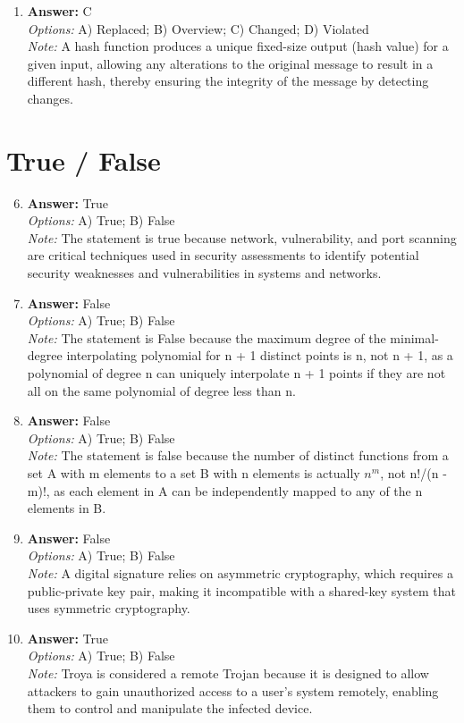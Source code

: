 \documentclass[12pt]{article}
\begin{document}
\begin{enumerate}[label=\arabic*.]
\\ \textit{Note:} The presence of several different classes of registers can enhance instruction-level parallelism and reduce dependency hazards, thereby facilitating rather than obstructing aggressive pipelining in an integer unit.
\item \textbf{Answer:} C
\\ \textit{Options:} A) Replaced; B) Overview; C) Changed; D) Violated
\\ \textit{Note:} A hash function produces a unique fixed-size output (hash value) for a given input, allowing any alterations to the original message to result in a different hash, thereby ensuring the integrity of the message by detecting changes.
\end{enumerate}

\section*{True / False}
\begin{enumerate}[label=\arabic*.]
\setcounter{enumi}{5}
\item \textbf{Answer:} True
\\ \textit{Options:} A) True; B) False
\\ \textit{Note:} The statement is true because network, vulnerability, and port scanning are critical techniques used in security assessments to identify potential security weaknesses and vulnerabilities in systems and networks.
\item \textbf{Answer:} False
\\ \textit{Options:} A) True; B) False
\\ \textit{Note:} The statement is False because the maximum degree of the minimal-degree interpolating polynomial for n + 1 distinct points is n, not n + 1, as a polynomial of degree n can uniquely interpolate n + 1 points if they are not all on the same polynomial of degree less than n.
\item \textbf{Answer:} False
\\ \textit{Options:} A) True; B) False
\\ \textit{Note:} The statement is false because the number of distinct functions from a set A with m elements to a set B with n elements is actually $n^m$, not n!/(n - m)!, as each element in A can be independently mapped to any of the n elements in B.
\item \textbf{Answer:} False
\\ \textit{Options:} A) True; B) False
\\ \textit{Note:} A digital signature relies on asymmetric cryptography, which requires a public-private key pair, making it incompatible with a shared-key system that uses symmetric cryptography.
\item \textbf{Answer:} True
\\ \textit{Options:} A) True; B) False
\\ \textit{Note:} Troya is considered a remote Trojan because it is designed to allow attackers to gain unauthorized access to a user's system remotely, enabling them to control and manipulate the infected device.
\end{enumerate}
\end{document}
